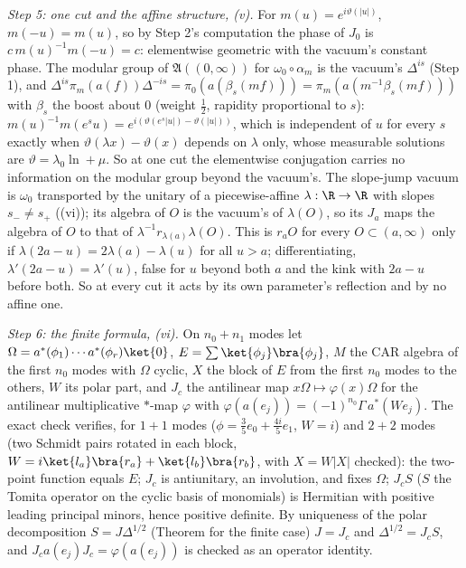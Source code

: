 \emph{Step 5: one cut and the affine structure, (v).} For $m(u) = e^{i\vartheta(|u|)}$, $m(-u) = m(u)$, so by Step 2's computation the phase of $J_{0}$ is $c\,m(u)^{-1}m(-u) = c$: elementwise geometric with the vacuum's constant phase. The modular group of $\mathfrak{A}((0, \infty))$ for $\omega_{0}\circ\alpha_{m}$ is the vacuum's $\Delta^{is}$ (Step 1), and $\Delta^{is}\pi_{m}(a(f))\Delta^{-is} = \pi_{0}(a(\beta_{s}(mf))) = \pi_{m}(a(m^{-1}\beta_{s}(mf)))$ with $\beta_{s}$ the boost about $0$ (weight $\tfrac12$, rapidity proportional to $s$): $m(u)^{-1}m(e^{s}u) = e^{i(\vartheta(e^{s}|u|) - \vartheta(|u|))}$, which is independent of $u$ for every $s$ exactly when $\vartheta(\lambda x) - \vartheta(x)$ depends on $\lambda$ only, whose measurable solutions are $\vartheta = \lambda_{0}\ln + \mu$. So at one cut the elementwise conjugation carries no information on the modular group beyond the vacuum's. The slope-jump vacuum is $\omega_{0}$ transported by the unitary of a piecewise-affine $\lambda : \R \to \R$ with slopes $s_{-} \neq s_{+}$ ((vi)); its algebra of $O$ is the vacuum's of $\lambda(O)$, so its $J_{a}$ maps the algebra of $O$ to that of $\lambda^{-1}r_{\lambda(a)}\lambda(O)$. This is $r_{a}O$ for every $O \subset (a, \infty)$ only if $\lambda(2a - u) = 2\lambda(a) - \lambda(u)$ for all $u > a$; differentiating, $\lambda'(2a - u) = \lambda'(u)$, false for $u$ beyond both $a$ and the kink with $2a - u$ before both. So at every cut it acts by its own parameter's reflection and by no affine one.

\emph{Step 6: the finite formula, (vi).} On $n_{0} + n_{1}$ modes let $\Omega = a^{*}(\phi_{1})\cdots a^{*}(\phi_{r})\ket{0}$, $E = \sum\ket{\phi_{j}}\bra{\phi_{j}}$, $M$ the CAR algebra of the first $n_{0}$ modes with $\Omega$ cyclic, $X$ the block of $E$ from the first $n_{0}$ modes to the others, $W$ its polar part, and $J_{c}$ the antilinear map $x\Omega \mapsto \varphi(x)\Omega$ for the antilinear multiplicative $*$-map $\varphi$ with $\varphi(a(e_{j})) = (-1)^{n_{0}}\Gamma\,a^{*}(We_{j})$. The exact check verifies, for $1 + 1$ modes ($\phi = \tfrac35e_{0} + \tfrac{4i}{5}e_{1}$, $W = i$) and $2 + 2$ modes (two Schmidt pairs rotated in each block, $W = i\ket{l_{a}}\bra{r_{a}} + \ket{l_{b}}\bra{r_{b}}$, with $X = W|X|$ checked): the two-point function equals $E$; $J_{c}$ is antiunitary, an involution, and fixes $\Omega$; $J_{c}S$ ($S$ the Tomita operator on the cyclic basis of monomials) is Hermitian with positive leading principal minors, hence positive definite. By uniqueness of the polar decomposition $S = J\Delta^{1/2}$ (Theorem  for the finite case) $J = J_{c}$ and $\Delta^{1/2} = J_{c}S$, and $J_{c}a(e_{j})J_{c} = \varphi(a(e_{j}))$ is checked as an operator identity.
